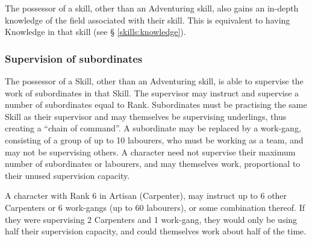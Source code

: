 \begin{multicols*}{3}
The possessor of a skill, other than an Adventuring skill, also gains
an in-depth knowledge of the field associated with their skill.  This
is equivalent to having Knowledge in that skill (see \S
\ref{skills:knowledge}).

\subsubsection{Supervision of subordinates}

The possessor of a Skill, other than an Adventuring skill, is able to
supervise the work of subordinates in that Skill.  The supervisor may
instruct and supervise a number of subordinates equal to Rank.
Subordinates must be practising the same Skill as their supervisor and
may themselves be supervising underlings, thus creating a ``chain of
command''.  A subordinate may be replaced by a work-gang, consisting
of a group of up to 10 labourers, who must be working as a team, and
may not be supervising others. A character need not supervise their
maximum number of subordinates or labourers, and may themselves work,
proportional to their unused supervision capacity.

\begin{example}
A character with Rank 6 in Artisan (Carpenter), may instruct up to 6
other Carpenters or 6 work-gangs (up to 60 labourers), or some
combination thereof.  If they were supervising 2 Carpenters and 1
work-gang, they would only be using half their supervision capacity,
and could themselves work about half of the time.
\end{example}

\end{multicols*}

